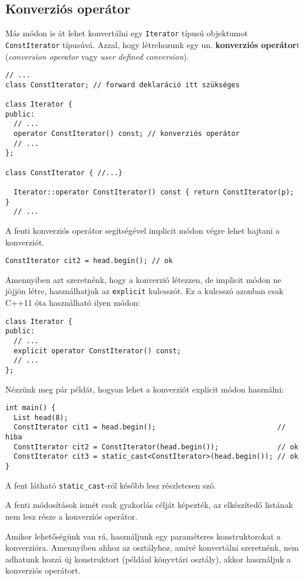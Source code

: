 \documentclass[../cpp_book/cpp_book.tex]{subfiles}
\begin{document}
	\subsection{Konverziós operátor}
	Más módon is át lehet konvertálni egy \texttt{Iterator} típusú objektumot \texttt{ConstIterator} típusúvá. Azzal, hogy létrehozunk egy un. \textbf{konverziós operátor}t (\textit{conversion operator} vagy \textit{user defined conversion}). 
	\begin{lstlisting}
// ...
class ConstIterator; // forward deklaráció itt szükséges

class Iterator {
public:
  // ...
  operator ConstIterator() const; // konverziós operátor
  // ...
};

class ConstIterator { //...}

  Iterator::operator ConstIterator() const { return ConstIterator(p); }
  // ...
	\end{lstlisting}
	A fenti konverziós operátor segítségével implicit módon végre lehet hajtani a konverziót. 
	\begin{lstlisting}
ConstIterator cit2 = head.begin(); // ok
	\end{lstlisting}	
	Amennyiben azt szeretnénk, hogy a konverzió létezzen, de implicit módon ne jöjjön létre, használhatjuk az \texttt{explicit} kulcsszót. Ez a kulcsszó azonban csak C++11 óta használható ilyen módon:
	\begin{lstlisting}
class Iterator {
public:
  // ...
  explicit operator ConstIterator() const;
  // ...
};
	\end{lstlisting}
	Nézzünk meg pár példát, hogyan lehet a konverziót explicit módon használni:
	\begin{lstlisting}
int main() {
  List head(8);
  ConstIterator cit1 = head.begin();                             // hiba
  ConstIterator cit2 = ConstIterator(head.begin());              // ok
  ConstIterator cit3 = static_cast<ConstIterator>(head.begin()); // ok
}
	\end{lstlisting}
	\begin{note}
		A fent látható \texttt{static\_cast}-ról később lesz részletesen szó.
	\end{note}
	\begin{note}
		A fenti módosítások ismét csak gyakorlás célját képezték, az elkészítedő listának nem lesz része a konverziós operátor.
	\end{note}
	\begin{note}
    Amikor lehetőségünk van rá, használjunk egy paraméteres konstruktorokat a konverzióra. Amennyiben ahhoz az osztályhoz, amivé konvertálni szeretnénk, nem adhatunk hozzá új konstruktort (például könyvtári osztály), akkor használjuk a konverziós operátort. 
	\end{note}
\end{document}
